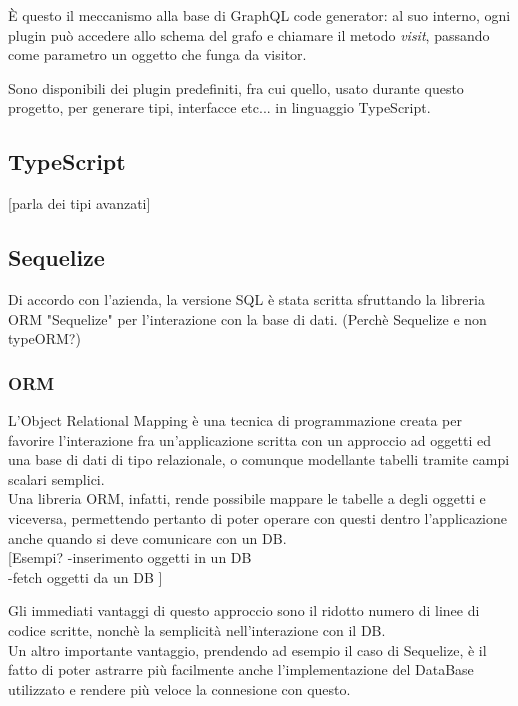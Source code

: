 \documentclass[a4paper, 12pt]{scrartcl}
\begin{document}
        È questo il meccanismo alla base di GraphQL code generator: al suo interno, ogni plugin può accedere allo schema del grafo e chiamare il metodo \emph{visit}, passando come parametro un oggetto che funga da visitor.

        Sono disponibili dei plugin predefiniti, fra cui quello, usato durante questo progetto, per generare tipi, interfacce etc... in linguaggio TypeScript.

    \subsection*{TypeScript}
      [parla dei tipi avanzati]

    \subsection*{Sequelize}
      Di accordo con l'azienda, la versione SQL è stata scritta sfruttando la libreria ORM "Sequelize" per l'interazione con la base di dati. (Perchè Sequelize e non typeORM?)

      \subsubsection*{ORM}
        L'Object Relational Mapping è una tecnica di programmazione creata per favorire l'interazione fra un'applicazione scritta con un approccio ad oggetti ed una base di dati di tipo relazionale, o comunque modellante tabelli tramite campi scalari semplici.\\
        Una libreria ORM, infatti, rende possibile mappare le tabelle a degli oggetti e viceversa, permettendo pertanto di poter operare con questi dentro l'applicazione anche quando si deve comunicare con un DB.\\

        [Esempi?
            -inserimento oggetti in un DB\\
            -fetch oggetti da un DB
        ]

        Gli immediati vantaggi di questo approccio sono il ridotto numero di linee di codice scritte, nonchè la semplicità nell'interazione con il DB.\\
        Un altro importante vantaggio, prendendo ad esempio il caso di Sequelize, è il fatto di poter astrarre più facilmente anche l'implementazione del DataBase utilizzato e rendere più veloce la connesione con questo.\\
\end{document}
